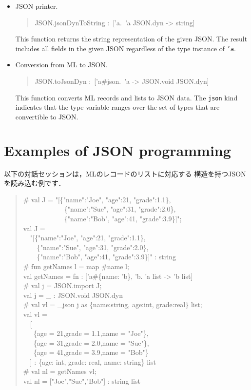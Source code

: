 \documentclass{jbook}
\newcommand{\txt}[2]{#2}
\newenvironment{program}{\begin{quote}\begin{tt}}%
                        {\end{tt}\end{quote}}
\begin{document}
\begin{itemize}
\item
        JSON printer.
\begin{program}
JSON.jsonDynToString :\ ['a.\ 'a JSON.dyn -> string]
\end{program}
	This function returns the string representation of the given JSON.
	The result includes all fields in the given JSON
regardless of the type instance of {\tt 'a}.

\item
	Conversion from ML to JSON.
\begin{program}
JSON.toJsonDyn :\ ['a\#json.\ 'a -> JSON.void JSON.dyn]
\end{program}
	This function converts ML records and lists to JSON data.
	The {\tt json} kind indicates that the type variable ranges
over the set of types that are convertible to JSON.

\end{itemize}

\fi%

\section{
\txt{JSONプログラミング例}
    {Examples of JSON programming}
}

\ifjp%
	以下の対話セッションは，MLのレコードのリストに対応する
構造を持つJSONを読み込む例です．
\begin{program}
\# val J = "[\{"name":"Joe", "age":21, "grade":1.1\},\ \\
\ \ \ \ \ \ \ \ \ \ \ \ \{"name":"Sue", "age":31, "grade":2.0\},\ \\
\ \ \ \ \ \ \ \ \ \ \ \ \{"name":"Bob", "age":41, "grade":3.9\}]";\\
val J =\\
\ \ "[\{"name":"Joe", "age":21, "grade":1.1\},\\
\ \ \ \ \{"name":"Sue", "age":31, "grade":2.0\},\\
\ \ \ \ \{"name":"Bob", "age":41, "grade":3.9\}]" : string\\
\# fun getNames l = map \#name l;\\
val getNames = fn : ['a\#\{name: 'b\}, 'b. 'a list -> 'b list]\\
\# val j = JSON.import J;\\
val j = \_ : JSON.void JSON.dyn\\
\# val vl = \_json j as \{name:string, age:int, grade:real\} list;\\
val vl =\\
\ \ [\\
\ \ \ \{age = 21,grade = 1.1,name = "Joe"\},\\
\ \ \ \{age = 31,grade = 2.0,name = "Sue"\},\\
\ \ \ \{age = 41,grade = 3.9,name = "Bob"\}\\
\ \ ] : \{age: int, grade: real, name: string\} list\\
\# val nl = getNames vl;\\
val nl = ["Joe","Sue","Bob"] : string list
\end{program}
\end{document}
